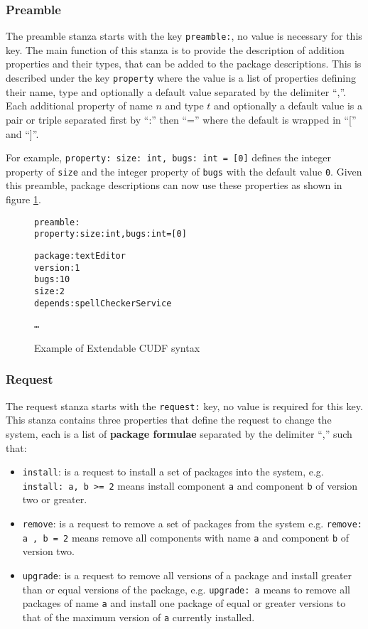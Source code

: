 \subsubsection{Preamble}
The preamble stanza starts with the key \verb+preamble:+, no value is necessary for this key.
The main function of this stanza is to provide the description of addition properties and their types, that can be added to the package descriptions.
This is described under the key \verb+property+ where the value is a list of properties defining their name, type and optionally a default value separated by the delimiter ``,''.
Each additional property of name $n$ and type $t$ and optionally a default value is a pair or triple separated first by ``:'' then ``='' where the default is wrapped in ``['' and ``]''.

For example, \verb+property: size: int, bugs: int = [0]+ defines the integer property of \verb+size+ and the integer property of \verb+bugs+ with the default value \verb+0+.
Given this preamble, package descriptions can now use these properties as shown in figure \ref{formal.cudfextensionexample}.

\begin{figure}[htp] 
\begin{center}
\begin{alltt}
preamble:
property: size: int, bugs: int = [0]

package: textEditor
version: 1
bugs: 10
size: 2
depends: spellCheckerService

\ldots

\end{alltt}
  \caption[Example of Extendable CUDF syntax]{Example of Extendable CUDF syntax}
  \label{formal.cudfextensionexample}
\end{center}
\end{figure}

\subsubsection{Request}
The request stanza starts with the \verb+request:+ key, no value is required for this key.
This stanza contains three properties that define the request to change the system,
each is a list of \textbf{package formulae} separated by the delimiter ``,'' such that:
\begin{itemize}
  \item \verb+install+: is a request to install a set of packages into the system,
  e.g. \verb+install: a, b >= 2+ means install component \verb+a+ and component \verb+b+ of version two or greater.
  \item \verb+remove+: is a request to remove a set of packages from the system 
  e.g. \verb+remove: a , b = 2+ means remove all components with name \verb+a+ and component \verb+b+ of version two.
  \item \verb+upgrade+: is a request to remove all versions of a package and install greater than or equal versions of the package,
  e.g. \verb+upgrade: a+ means to remove all packages of name \verb+a+ and install one package of equal or greater versions to that of the maximum version of \verb+a+ currently installed. 
\end{itemize}

